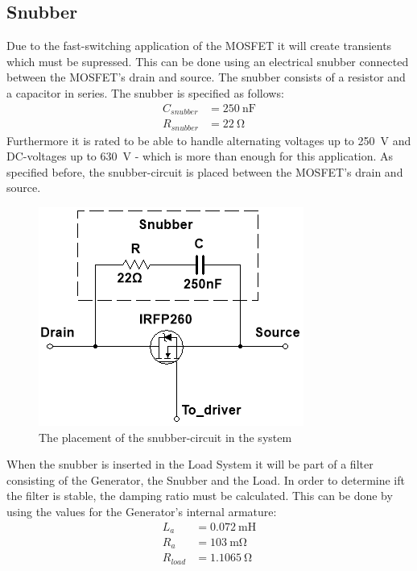 \subsection{Snubber}
Due to the fast-switching application of the MOSFET it will create transients which must be supressed. This can be done using an electrical snubber connected between the MOSFET's drain and source. The snubber consists of a resistor and a capacitor in series. The snubber is specified as follows:
\begin{equation}
	\begin{split}
		C_{snubber} &= \SI{250}{\nano \farad}\\
		R_{snubber} &= \SI{22}{\ohm}
	\end{split}
\end{equation}
Furthermore it is rated to be able to handle alternating voltages up to \SI{250}{\volt} and DC-voltages up to \SI{630}{\volt} - which is more than enough for this application. As specified before, the snubber-circuit is placed between the MOSFET's drain and source.

\begin{figure}[H]
	\centering
	\includegraphics[width=0.5\linewidth]{Hardware/LoadSystem/Snubber}
	\caption{The placement of the snubber-circuit in the system}
	\label{fig:SnubberCircuit}
\end{figure}

When the snubber is inserted in the Load System it will be part of a filter consisting of the Generator, the Snubber and the Load. In order to determine ift the filter is stable, the damping ratio must be calculated. This can be done by using the values for the Generator's internal armature: 
\begin{equation}
	\begin{split}
		L_a &= \SI{0.072}{\milli \henry}\\
		R_a &= \SI{103}{\milli \ohm}\\
		R_{load} &= \SI{1.1065}{\ohm}
	\end{split}
\end{equation}

